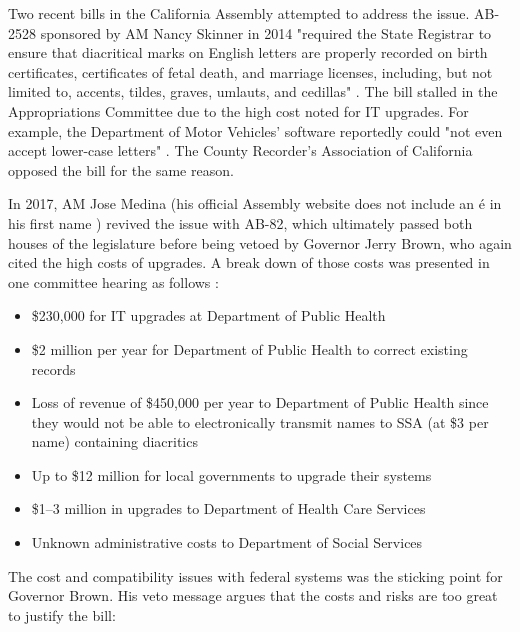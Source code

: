Two recent bills in the California Assembly attempted to address the issue.
AB-2528 sponsored by AM Nancy Skinner in 2014 "required the State Registrar to
ensure that diacritical marks on English letters are properly recorded on birth
certificates, certificates of fetal death, and marriage licenses, including,
but not limited to, accents, tildes, graves, umlauts, and cedillas"
\parencite{ab2528}. The bill stalled in the Appropriations Committee due to the
high cost noted for IT upgrades. For example, the Department of Motor Vehicles'
software reportedly could "not even accept lower-case letters"
\parencite{approp}. The County Recorder's Association of California opposed the
bill for the same reason.

In 2017, AM Jose Medina (his official Assembly website does not include an é in
his first name \parencite{medina}) revived the issue with AB-82, which
ultimately passed both houses of the legislature before being vetoed by
Governor Jerry Brown, who again cited the high costs of upgrades. A break down
of those costs was presented in one committee hearing as follows
\parencite{approp2}:

\begin{itemize}

\item \$230,000 for IT upgrades at Department of Public Health

\item \$2 million per year for Department of Public Health to correct existing
records

\item Loss of revenue of \$450,000 per year to Department of Public Health
since they would not be able to electronically transmit names to SSA (at \$3
per name) containing diacritics

\item Up to \$12 million for local governments to upgrade their systems

\item \$1--3 million in upgrades to Department of Health Care Services

\item Unknown administrative costs to Department of Social Services

\end{itemize}

The cost and compatibility issues with federal systems was the sticking point
for Governor Brown. His veto message argues that the costs and risks are too
great to justify the bill:

